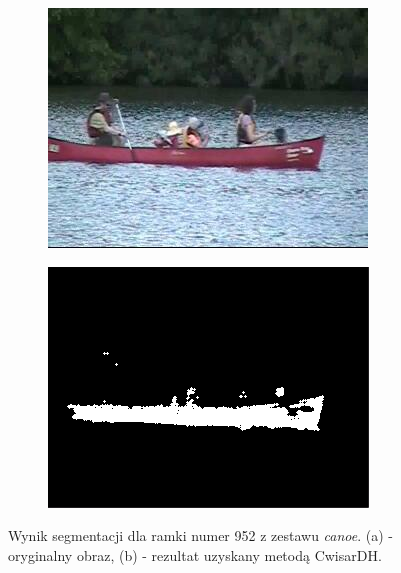 \begin{figure}[!h]
\centering
\begin{subfigure}[b]{0.4\textwidth}
\includegraphics[width=\textwidth]{img/CwisarDHIn}
\caption{}
\end{subfigure}
\quad
\begin{subfigure}[b]{0.4\textwidth}
\includegraphics[width=\textwidth]{img/CwisarDHOut}
\caption{}
\end{subfigure}
\caption{Wynik segmentacji dla ramki numer 952 z zestawu \textit{canoe}. (a) - oryginalny obraz, (b) - rezultat uzyskany metodą CwisarDH.\label{fig:CwisarDH}}
\end{figure}

